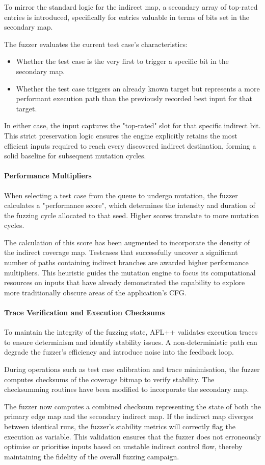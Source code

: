 To mirror the standard logic for the indirect map, a secondary array of top-rated entries is introduced, specifically for entries valuable in terms of bits set in the secondary map.

The fuzzer evaluates the current test case's characteristics: 
\begin{itemize}
    \item Whether the test case is the very first to trigger a specific bit in the secondary map.

    \item Whether the test case triggers an already known target but represents a more performant execution path than the previously recorded best input for that target.
\end{itemize}
In either case, the input captures the "top-rated" slot for that specific indirect bit. This strict preservation logic ensures the engine explicitly retains the most efficient inputs required to reach every discovered indirect destination, forming a solid baseline for subsequent mutation cycles.

\paragraph{Performance Multipliers} When selecting a test case from the queue to undergo mutation, the fuzzer calculates a "performance score", which determines the intensity and duration of the fuzzing cycle allocated to that seed. Higher scores translate to more mutation cycles. 

The calculation of this score has been augmented to incorporate the density of the indirect coverage map. Testcases that successfully uncover a significant number of paths containing indirect branches are awarded higher performance multipliers. This heuristic guides the mutation engine to focus its computational resources on inputs that have already demonstrated the capability to explore more traditionally obscure areas of the application's CFG. 

\paragraph{Trace Verification and Execution Checksums} To maintain the integrity of the fuzzing state, AFL++ validates execution traces to ensure determinism and identify stability issues. A non-deterministic path can degrade the fuzzer's efficiency and introduce noise into the feedback loop. 

During operations such as test case calibration and trace minimisation, the fuzzer computes checksums of the coverage bitmap to verify stability. The checksumming routines have been modified to incorporate the secondary map.

The fuzzer now computes a combined checksum representing the state of both the primary edge map and the secondary indirect map. If the indirect map diverges between identical runs, the fuzzer's stability metrics will correctly flag the execution as variable. This validation ensures that the fuzzer does not erroneously optimise or prioritise inputs based on unstable indirect control flow, thereby maintaining the fidelity of the overall fuzzing campaign.